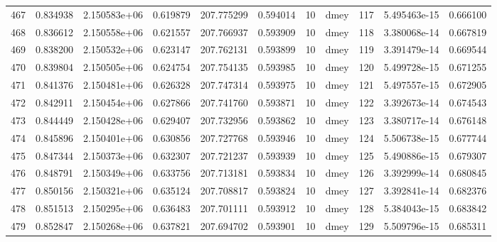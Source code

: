 \begin{tabular}{lrrrrrrlrrr}
467  &    0.834938 &        2.150583e+06 &  0.619879 &              207.775299 &    0.594014 &      10 &         dmey &    117 &   5.495463e-15 &      0.666100 \\
468  &    0.836612 &        2.150558e+06 &  0.621557 &              207.766937 &    0.593909 &      10 &         dmey &    118 &   3.380068e-14 &      0.667819 \\
469  &    0.838200 &        2.150532e+06 &  0.623147 &              207.762131 &    0.593899 &      10 &         dmey &    119 &   3.391479e-14 &      0.669544 \\
470  &    0.839804 &        2.150505e+06 &  0.624754 &              207.754135 &    0.593985 &      10 &         dmey &    120 &   5.499728e-15 &      0.671255 \\
471  &    0.841376 &        2.150481e+06 &  0.626328 &              207.747314 &    0.593975 &      10 &         dmey &    121 &   5.497557e-15 &      0.672905 \\
472  &    0.842911 &        2.150454e+06 &  0.627866 &              207.741760 &    0.593871 &      10 &         dmey &    122 &   3.392673e-14 &      0.674543 \\
473  &    0.844449 &        2.150428e+06 &  0.629407 &              207.732956 &    0.593862 &      10 &         dmey &    123 &   3.380717e-14 &      0.676148 \\
474  &    0.845896 &        2.150401e+06 &  0.630856 &              207.727768 &    0.593946 &      10 &         dmey &    124 &   5.506738e-15 &      0.677744 \\
475  &    0.847344 &        2.150373e+06 &  0.632307 &              207.721237 &    0.593939 &      10 &         dmey &    125 &   5.490886e-15 &      0.679307 \\
476  &    0.848791 &        2.150349e+06 &  0.633756 &              207.713181 &    0.593834 &      10 &         dmey &    126 &   3.392999e-14 &      0.680845 \\
477  &    0.850156 &        2.150321e+06 &  0.635124 &              207.708817 &    0.593824 &      10 &         dmey &    127 &   3.392841e-14 &      0.682376 \\
478  &    0.851513 &        2.150295e+06 &  0.636483 &              207.701111 &    0.593912 &      10 &         dmey &    128 &   5.384043e-15 &      0.683842 \\
479  &    0.852847 &        2.150268e+06 &  0.637821 &              207.694702 &    0.593901 &      10 &         dmey &    129 &   5.509796e-15 &      0.685311 \\

\end{tabular}
